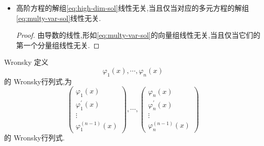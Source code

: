 \documentclass[lang=cn,12pt,color=green,fontset=none]{elegantbook}
\begin{document}
\begin{remark}
    \begin{itemize}
        \item 高阶方程的解组\ref{eq:high-dim-sol}线性无关,当且仅当对应的多元方程的解组\ref{eq:multy-var-sol}线性无关.
        \begin{proof}
            由导数的线性,形如\ref{eq:multy-var-sol}的向量组线性无关,当且仅当它们的第一个分量组线性无关.
        \end{proof}
    \end{itemize}
    
\end{remark}

\begin{definition}{Wronsky}
    定义 
    \begin{equation}
        \varphi _{1}\left( x \right),\cdots ,\varphi _{n}\left( x \right)  
    \end{equation}的 Wronsky行列式,为
    \begin{equation}
        \begin{pmatrix} 
            \varphi_{1}\left( x \right)\\ 
             \varphi _{1}^{\prime} \left( x \right)\\ 
              \vdots \\ 
               \varphi _{1}^{\left( n-1 \right) }\left( x \right)    
        \end{pmatrix} ,\cdots ,\begin{pmatrix} 
            \varphi_{n}\left( x \right)\\ 
             \varphi _{n}^{\prime} \left( x \right)\\ 
              \vdots \\ 
               \varphi _{n}^{\left( n-1 \right) }\left( x \right)    
        \end{pmatrix}
    \end{equation}的 Wronsky行列式.
\end{definition}
\end{document}
